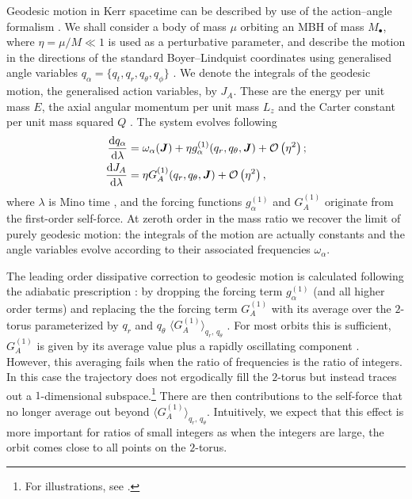 Geodesic motion in Kerr spacetime can be described by use of the action--angle formalism \citep[chapter 10]{Goldstein2002}. We shall consider a body of mass $\mu$ orbiting an MBH of mass $M_\bullet$, where $\eta = \mu/M \ll 1$ is used as a perturbative parameter, and describe the motion in the directions of the standard Boyer--Lindquist coordinates using generalised angle variables $q_\alpha = \{q_t,q_r,q_\theta,q_\phi\}$ \citep{Hinderer2008}. We denote the integrals of the geodesic motion, the generalised action variables, by $J_A$. These are the energy per unit mass $E$, the axial angular momentum per unit mass $L_z$ and the Carter constant per unit mass squared $Q$ \citep{Carter1968}. The system evolves following \citep{Flanagan2012}
\begin{subequations}
\begin{align}
\dfrac{\mathrm{d} {q_\alpha}}{\mathrm{d} {\lambda}} = {} & \omega_\alpha(\boldsymbol{J}) + \eta g_\alpha^{(1)}(q_r,q_\theta,\boldsymbol{J}) + \mathcal{O}\left({\eta^2}\right); \\
\dfrac{\mathrm{d} {J_A}}{\mathrm{d} {\lambda}} = {} & \eta G_A^{(1)}(q_r,q_\theta,\boldsymbol{J}) + \mathcal{O}\left({\eta^2}\right),
\end{align}
\end{subequations}
where $\lambda$ is Mino time \citep{Mino2003}, and the forcing functions $g_\alpha^{(1)}$ and $G_A^{(1)}$ originate from the first-order self-force. At zeroth order in the mass ratio we recover the limit of purely geodesic motion: the integrals of the motion are actually constants and the angle variables evolve according to their associated frequencies $\omega_\alpha$.

The leading order dissipative correction to geodesic motion is calculated following the adiabatic prescription \citep{Hinderer2008}: by dropping the forcing term $g_\alpha^{(1)}$ (and all higher order terms) and replacing the the forcing term $G_A^{(1)}$ with its average over the $2$-torus parameterized by $q_r$ and $q_\theta$ $\langle G_A^{(1)}\rangle_{q_r,\,q_\theta}$ \citep{Drasco2005}. For most orbits this is sufficient, $G_A^{(1)}$ is given by its average value plus a rapidly oscillating component \citep[chapter 5, section 1]{Arnold1988}. However, this averaging fails when the ratio of frequencies is the ratio of integers. In this case the trajectory does not ergodically fill the $2$-torus but instead traces out a $1$-dimensional subspace.\footnote{For illustrations, see \citet{Grossman2012}.} There are then contributions to the self-force that no longer average out beyond $\langle G_A^{(1)}\rangle_{q_r,\,q_\theta}$. Intuitively, we expect that this effect is more important for ratios of small integers as when the integers are large, the orbit comes close to all points on the $2$-torus.

